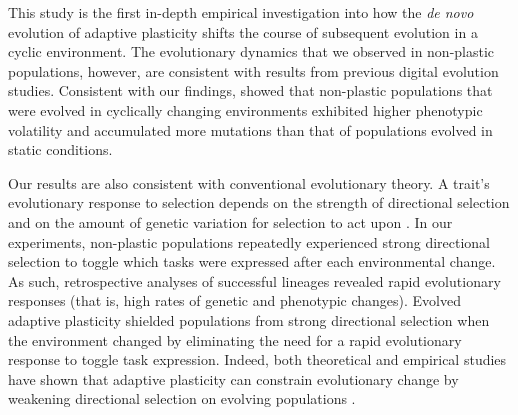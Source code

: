 This study is the first in-depth empirical investigation into how the \textit{de novo} evolution of adaptive plasticity shifts the course of subsequent evolution in a cyclic environment.
The evolutionary dynamics that we observed in non-plastic populations, however, are consistent with results from previous digital evolution studies. 
Consistent with our findings, \cite{dolson_interpreting_2020} showed that non-plastic populations that were evolved in cyclically changing environments exhibited higher phenotypic volatility and accumulated more mutations than that of populations evolved in static conditions.


Our results are also consistent with conventional evolutionary theory.
A trait's evolutionary response to selection depends on the strength of directional selection and on the amount of genetic variation for selection to act upon \citep{lande_measurement_1983,zimmer_evolution_2013}.
In our experiments, non-plastic populations repeatedly experienced strong directional selection to toggle which tasks were expressed after each environmental change.
As such, retrospective analyses of successful lineages revealed rapid evolutionary responses (that is, high rates of genetic and phenotypic changes).
Evolved adaptive plasticity shielded populations from strong directional selection when the environment changed by eliminating the need for a rapid evolutionary response to toggle task expression.
Indeed, both theoretical and empirical studies have shown that adaptive plasticity can constrain evolutionary change by weakening directional selection on evolving populations \citep{price_role_2003,paenke_influence_2007,ghalambor_non-adaptive_2015}. 

